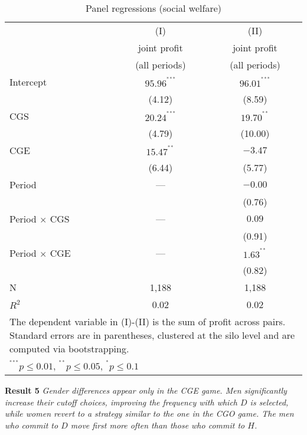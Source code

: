 \documentclass[12pt, letterpaper]{article}
\theoremstyle{plain}
\begin{document}
\begin{table}[ht]
\centering
\caption{Panel regressions (social welfare)}
\footnotesize
\begin{tabular}{lcc}
\hline
  & (I) & (II)  \\
&  joint profit   & joint profit  \\
&  (all periods)   & (all periods) \\
    \hline
Intercept & $95.96^{^{***}}$  &$ 96.01^{^{***}}$ \\
& (4.12) & (8.59)  \\
CGS &  $20.24^{^{***}}$  & $ 19.70^{^{**}}$ \\
& (4.79)  & (10.00)  \\
CGE &  $15.47^{^{**}}$ & $-3.47$  \\
& (6.44)   & (5.77)  \\
Period & ---&$-0.00$ \\
&  & (0.76)\\
Period $\times$ CGS & ---&$0.09$ \\
&  & (0.91)   \\
Period $\times$ CGE & ---&$1.63^{^{**}}$\\
&  & (0.82)  \\

\hline
N & 1,188  & 1,188 \\ 
$R^2$ & 0.02  & 0.02  \\
\hline
\hline
 \multicolumn{3}{p{.7\textwidth}}{\scriptsize{The dependent variable in (I)-(II) is the sum of profit across pairs. Standard errors are in parentheses, clustered at the silo level and are computed via bootstrapping.}}\\ 
 \multicolumn{3}{p{0.4\textwidth}}{\scriptsize{ $^{^{***}}p\leq0.01$,
    $^{^{**}}p\leq0.05$, $^{^{*}}p\leq0.1$}} \\
\end{tabular}
\label{table:ols_jointprofit}
\end{table}

\noindent \textbf{Result 5}
\textit{Gender differences appear only in the CGE game. Men significantly increase their cutoff choices, improving the frequency with which $D$ is selected, while women revert to a strategy similar to the one in the CGO game. The men who commit to $D$ move first more often than those who commit to $H$.}\\
\end{document}
